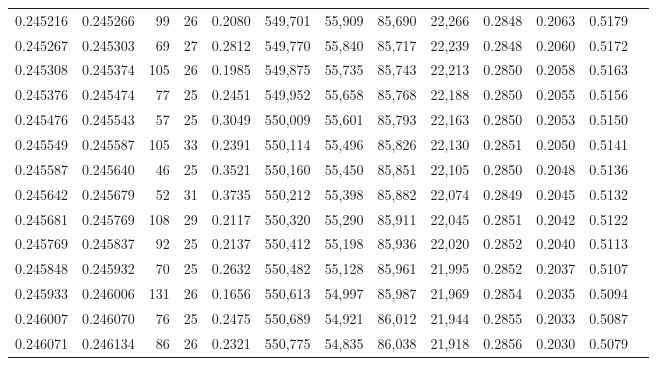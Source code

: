 \begin{tabular}{rrrrrrrrrrrrr}
0.245216 & 0.245266 &  99 &  26 &                                     0.2080 & 549,701 &  55,909 &  85,690 &  22,266 & 0.2848 & 0.2063 & 0.5179 \\
0.245267 & 0.245303 &  69 &  27 &                                     0.2812 & 549,770 &  55,840 &  85,717 &  22,239 & 0.2848 & 0.2060 & 0.5172 \\
0.245308 & 0.245374 & 105 &  26 &                                     0.1985 & 549,875 &  55,735 &  85,743 &  22,213 & 0.2850 & 0.2058 & 0.5163 \\
0.245376 & 0.245474 &  77 &  25 &                                     0.2451 & 549,952 &  55,658 &  85,768 &  22,188 & 0.2850 & 0.2055 & 0.5156 \\
0.245476 & 0.245543 &  57 &  25 &                                     0.3049 & 550,009 &  55,601 &  85,793 &  22,163 & 0.2850 & 0.2053 & 0.5150 \\
0.245549 & 0.245587 & 105 &  33 &                                     0.2391 & 550,114 &  55,496 &  85,826 &  22,130 & 0.2851 & 0.2050 & 0.5141 \\
0.245587 & 0.245640 &  46 &  25 &                                     0.3521 & 550,160 &  55,450 &  85,851 &  22,105 & 0.2850 & 0.2048 & 0.5136 \\
0.245642 & 0.245679 &  52 &  31 &                                     0.3735 & 550,212 &  55,398 &  85,882 &  22,074 & 0.2849 & 0.2045 & 0.5132 \\
0.245681 & 0.245769 & 108 &  29 &                                     0.2117 & 550,320 &  55,290 &  85,911 &  22,045 & 0.2851 & 0.2042 & 0.5122 \\
0.245769 & 0.245837 &  92 &  25 &                                     0.2137 & 550,412 &  55,198 &  85,936 &  22,020 & 0.2852 & 0.2040 & 0.5113 \\
0.245848 & 0.245932 &  70 &  25 &                                     0.2632 & 550,482 &  55,128 &  85,961 &  21,995 & 0.2852 & 0.2037 & 0.5107 \\
0.245933 & 0.246006 & 131 &  26 &                                     0.1656 & 550,613 &  54,997 &  85,987 &  21,969 & 0.2854 & 0.2035 & 0.5094 \\
0.246007 & 0.246070 &  76 &  25 &                                     0.2475 & 550,689 &  54,921 &  86,012 &  21,944 & 0.2855 & 0.2033 & 0.5087 \\
0.246071 & 0.246134 &  86 &  26 &                                     0.2321 & 550,775 &  54,835 &  86,038 &  21,918 & 0.2856 & 0.2030 & 0.5079 \\

\end{tabular}

